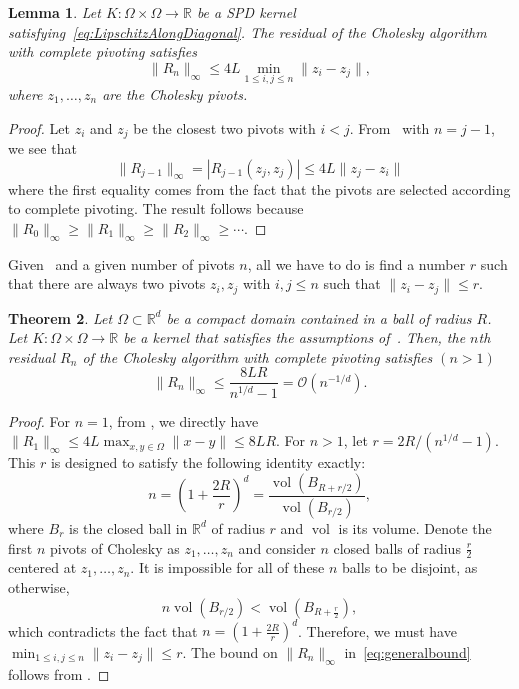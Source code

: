 \documentclass{amsart}
\newtheorem{theorem}{Theorem}[section]
\newtheorem{lemma}[theorem]{Lemma}
\theoremstyle{definition}
\theoremstyle{remark}
\begin{document}
\begin{lemma}\label{prop:pivotdistance}
    Let $K:\Omega\times \Omega\to\mathbb{R}$ be a SPD kernel satisfying~\cref{eq:LipschitzAlongDiagonal}. The residual of the Cholesky algorithm with complete pivoting satisfies 
    \[
    \|R_n\|_\infty \leq 4L \min_{1\leq i,j\leq n} \|z_i - z_j\|,
    \]
    where $z_1,\ldots,z_n$ are the Cholesky pivots. 
\end{lemma}
\begin{proof}
    Let $z_i$ and $z_j$ be the closest two pivots with $i<j$. From~ with $n = j-1$, we see that 
    \[
    \|R_{j-1}\|_\infty = |R_{j-1}(z_j,z_j)| \leq 4L \|z_j - z_i\|
    \]
    where the first equality comes from the fact that the pivots are selected according to complete pivoting. The result follows because $\|R_0\|_\infty \geq \|R_1\|_\infty \geq \|R_2\|_\infty\geq \cdots$.
\end{proof}

Given~ and a given number of pivots $n$, all we have to do is find a number $r$ such that there are always two pivots $z_i, z_j$ with $i, j\leq n$ such that $\|z_i - z_j\| \leq r$. 

\begin{theorem}\label{thm:convergencegeneral}
    Let $\Omega \subset \mathbb{R}^d$ be a compact domain contained in a ball of radius $R$. Let $K:\Omega\times \Omega\to\mathbb{R}$ be a kernel that satisfies the assumptions of~. Then, the $n$th residual $R_n$ of the Cholesky algorithm with complete pivoting satisfies $(n>1)$
    \begin{equation}\label{eq:generalbound}
        \|R_n\|_{\infty} \leq \frac{8LR}{n^{1/d}-1} = \mathcal{O}(n^{-1/d}). 
    \end{equation}
\end{theorem}
\begin{proof}
    For $n=1$, from , we directly have $\|R_1\|_\infty \leq 4L \max_{x, y\in\Omega}\|x-y\| \leq 8LR$. For $n>1$, let $r = 2R/(n^{1/d}-1)$. This $r$ is designed to satisfy the following identity exactly:
    \begin{equation*}
        n = \left(1 + \frac{2R}{r}\right)^d = \frac{\operatorname{vol}(B_{R + r/2})}{\operatorname{vol}(B_{r/2})}, 
    \end{equation*}
    where $B_r$ is the closed ball in $\mathbb{R}^d$ of radius $r$ and $\operatorname{vol}$ is its volume. Denote the first $n$ pivots of Cholesky as $z_1, \dots, z_n$ and consider $n$ closed balls of radius $\frac{r}{2}$ centered at $z_1, \dots, z_n$. It is impossible for all of these $n$ balls to be disjoint, as otherwise, 
        \begin{equation*}
        n \operatorname{vol}(B_{r/2}) < \operatorname{vol}(B_{R+\frac{r}{2}}),
    \end{equation*}
    which contradicts the fact that $n = \left(1 + \frac{2R}{r}\right)^d$. Therefore, we must have $\min_{1\leq i,j\leq n}\|z_i - z_j\|\leq r$. The bound on $\|R_n\|_\infty$ in~\cref{eq:generalbound} follows from .
\end{proof}
\end{document}
